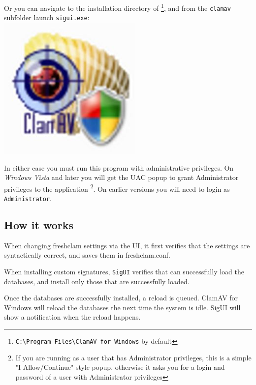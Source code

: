 Or you can navigate to the installation directory of \CW
\footnote{\texttt{C:\textbackslash Program Files\textbackslash ClamAV for Windows} by default},
and from the \texttt{clamav} subfolder launch \texttt{sigui.exe}:\\
\includegraphics{sigui_icon.jpg}

In either case you must run this program with administrative privileges.
On \emph{Windows Vista} and later you will get the UAC popup to grant Administrator privileges to the application \footnote{If you are running as a user that has Administrator privileges, this is a simple "I Allow/Continue" style popup, otherwise it asks you for a login and password of a user with Administrator privileges}. On earlier versions you will need to login as \verb+Administrator+.

\subsection{How it works}

When changing \gls{freshclam} settings via the UI, it first verifies that the
settings are syntactically correct, and saves them in \gls{freshclam.conf}.

When installing custom signatures, \verb+SigUI+ verifies that \ClamAV can successfully load the databases, and install only those that are successfully loaded.

Once the databases are successfully installed, a reload is queued. ClamAV for Windows will reload the databases the next time the system is idle. SigUI will show a notification when the reload happens.